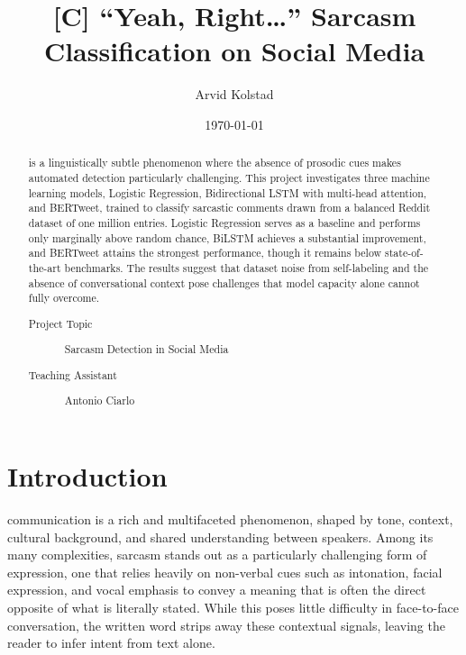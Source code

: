 \documentclass[
 reprint,
 amsmath,amssymb,
 aps,
]{revtex4-2}
\begin{document}
\title{[C] “Yeah, Right…”
	Sarcasm Classification on  Social Media}

\author{Arvid Kolstad}

\date{\today}%

\begin{abstract} %

	 is a linguistically subtle phenomenon where the absence of prosodic cues makes automated detection particularly challenging. This project investigates three machine learning models, Logistic Regression, Bidirectional LSTM with multi-head attention, and BERTweet, trained to classify sarcastic comments drawn from a balanced Reddit dataset of one million entries. Logistic Regression serves as a baseline and performs only marginally above random chance, BiLSTM achieves a substantial improvement, and BERTweet attains the strongest performance, though it remains below state-of-the-art benchmarks. The results suggest that dataset noise from self-labeling and the absence of conversational context pose challenges that model capacity alone cannot fully overcome.

	\begin{description} %
		\item[Project Topic] %
		      {Sarcasm Detection in Social Media}
		\item[Teaching Assistant] %
		      {Antonio Ciarlo} %
	\end{description} %
\end{abstract}

\maketitle




\section{\label{sec:intro}Introduction} %

 communication is a rich and multifaceted phenomenon, shaped by tone, context, cultural background, and shared understanding between speakers. Among its many complexities, sarcasm stands out as a particularly challenging form of expression, one that relies heavily on non-verbal cues such as intonation, facial expression, and vocal emphasis to convey a meaning that is often the direct opposite of what is literally stated. While this poses little difficulty in face-to-face conversation, the written word strips away these contextual signals, leaving the reader to infer intent from text alone.
\end{document}
